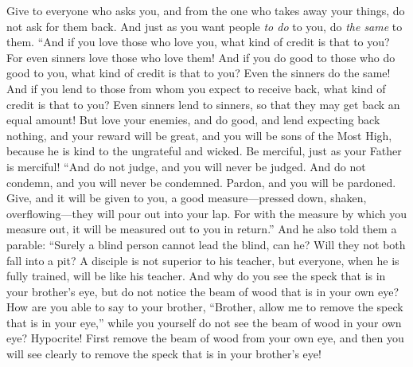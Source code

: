 \begin{biblechapter}
\verse Give to everyone who asks you, and from the one who takes away your things, do not ask for them back.
\verse And just as you want people \textit{to do} to you, do \textit{the same} to them.
\verse “And if you love those who love you, what kind of credit is that to you? For even sinners love those who love them!
\verse And if you do good to those who do good to you, what kind of credit is that to you? Even the sinners do the same!
\verse And if you lend to those from whom you expect to receive back, what kind of credit is that to you? Even sinners lend to sinners, so that they may get back an equal amount!
\verse But love your enemies, and do good, and lend expecting back nothing, and your reward will be great, and you will be sons of the Most High, because he is kind to the ungrateful and wicked.
\verse Be merciful, just as your Father is merciful!
 “And do not judge, and you will never be judged. And do not condemn, and you will never be condemned. Pardon, and you will be pardoned.
\verse Give, and it will be given to you, a good measure—pressed down, shaken, overflowing—they will pour out into your lap. For with the measure by which you measure out, it will be measured out to you in return.”
\verse And he also told them a parable: “Surely a blind person cannot lead the blind, can he? Will they not both fall into a pit?
\verse A disciple is not superior to his teacher, but everyone, when he is fully trained, will be like his teacher.
\verse And why do you see the speck that is in your brother’s eye, but do not notice the beam of wood that is in your own eye?
\verse How are you able to say to your brother, “Brother, allow me to remove the speck that is in your eye,” while you yourself do not see the beam of wood in your own eye? Hypocrite! First remove the beam of wood from your own eye, and then you will see clearly to remove the speck that is in your brother’s eye!

\end{biblechapter}

